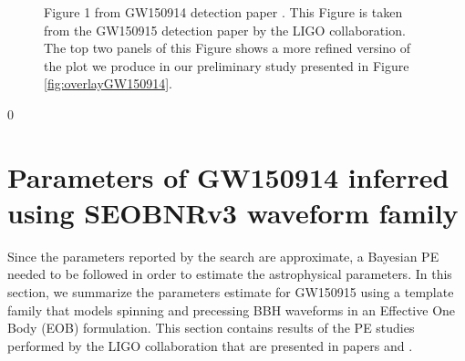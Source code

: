 \begin{figure}
\caption{Figure 1 from GW150914 detection paper \cite{gw150914detection} . This Figure is taken from the GW150915 detection paper \cite{gw150914detection} by the LIGO collaboration. The top two panels of this Figure shows a more refined versino of the plot we produce in our preliminary study presented in Figure \ref{fig:overlayGW150914}.}
\label{fig:Fig1GW150914detection}
\end{figure}0

\section{Parameters of GW150914 inferred using SEOBNRv3 waveform family}


Since the parameters reported by the search are approximate, a Bayesian PE needed to be followed in order to estimate the astrophysical parameters. In this section, we summarize the parameters estimate for GW150915 using a template family that models spinning and precessing BBH waveforms in an Effective One Body (EOB) formulation. This section contains results of the PE studies performed by the LIGO collaboration that are presented in papers \cite{gw150914PE} and \cite{gw150914PEseobnrv3}.



